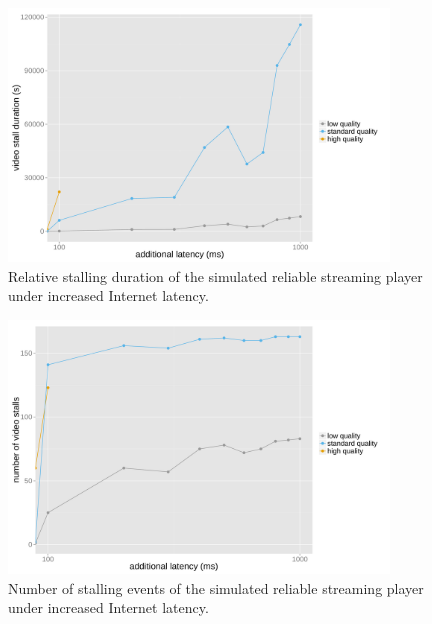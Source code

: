 
\begin{figure}[htb]
	\centering
	\includegraphics[width=0.9\textwidth]{images/R-ltesim-latencyseries-stallduration.pdf}
	\caption{Relative stalling duration of the simulated reliable streaming player under increased Internet latency.}
\label{c6:fig:ltesim-latencyseries-stallduration}
\end{figure}

\begin{figure}[htb]
	\centering
	\includegraphics[width=0.9\textwidth]{images/R-ltesim-latencyseries-numstalls.pdf}
	\caption{Number of stalling events of the simulated reliable streaming player under increased Internet latency.}
\label{c6:fig:ltesim-latencyseries-numstalls}
\end{figure}

